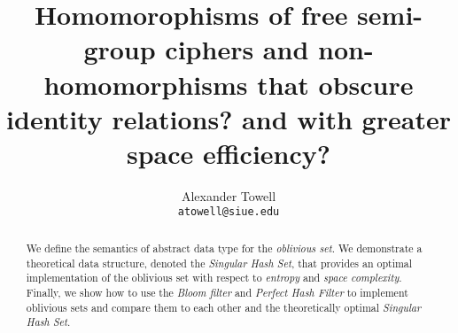 \documentclass[final,11pt,hidelinks]{article}
\title
{
    Homomorophisms of free semi-group ciphers and non-homomorphisms that obscure identity relations? and with greater space efficiency?
}
\author
{
    Alexander Towell\\
    \texttt{atowell@siue.edu}
}
\date{}
\begin{document}
\maketitle
\begin{abstract}
We define the semantics of abstract data type for the \emph{oblivious set}. We demonstrate a theoretical data structure, denoted the \emph{Singular Hash Set}, that provides an optimal implementation of the oblivious set with respect to \emph{entropy} and \emph{space complexity}. Finally, we show how to use the \emph{Bloom filter} and \emph{Perfect Hash Filter} to implement oblivious sets and compare them to each other and the theoretically optimal \emph{Singular Hash Set}.
\end{abstract}


\tableofcontents
{}



%








%
\printglossary

\end{document}
